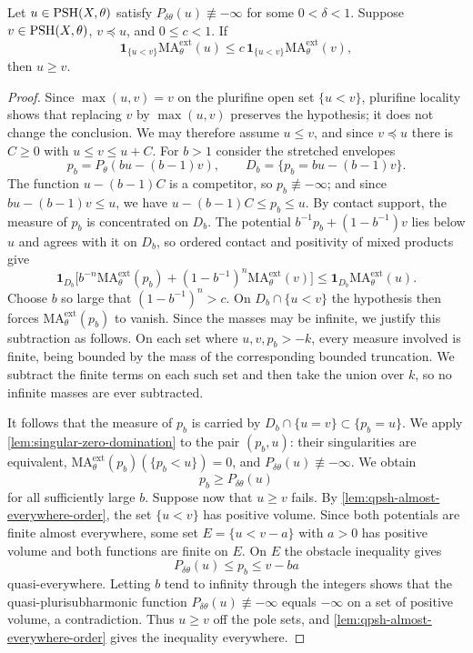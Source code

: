 \begin{theorem}\label{thm:singular-strict-domination}
Let $u\in\mathrm{PSH}(X,\theta)$ satisfy $P_{\delta\theta}(u)\not\equiv-\infty$ for some $0<\delta<1$. Suppose $v\in\mathrm{PSH}(X,\theta)$, $v\preceq u$, and $0\leq c<1$. If
\[
 \mathbf1_{\{u<v\}}\mathrm{MA}^{\mathrm{ext}}_\theta(u)
 \leq c\,\mathbf1_{\{u<v\}}\mathrm{MA}^{\mathrm{ext}}_\theta(v),
\]
then $u\geq v$.
\end{theorem}
\begin{proof}
Since $\max(u,v)=v$ on the plurifine open set $\{u<v\}$, plurifine locality shows that replacing $v$ by $\max(u,v)$ preserves the hypothesis; it does not change the conclusion. We may therefore assume $u\leq v$, and since $v\preceq u$ there is $C\geq0$ with
$u\leq v\leq u+C$. For $b>1$ consider the stretched envelopes
\[
 p_b=P_\theta(bu-(b-1)v),\qquad
 D_b=\{p_b=bu-(b-1)v\}.
\]
The function $u-(b-1)C$ is a competitor, so $p_b\not\equiv-\infty$; and since $bu-(b-1)v\leq u$, we have
$u-(b-1)C\leq p_b\leq u$. By contact support, the measure of $p_b$ is concentrated on $D_b$. The potential
$b^{-1}p_b+(1-b^{-1})v$ lies below $u$ and agrees with it on $D_b$, so ordered contact and positivity of mixed products give
\[
 \mathbf1_{D_b}\bigl[b^{-n}\mathrm{MA}^{\mathrm{ext}}_\theta(p_b)
 +(1-b^{-1})^n\mathrm{MA}^{\mathrm{ext}}_\theta(v)\bigr]
 \leq\mathbf1_{D_b}\mathrm{MA}^{\mathrm{ext}}_\theta(u).
\]
Choose $b$ so large that $(1-b^{-1})^n>c$. On $D_b\cap\{u<v\}$ the hypothesis then forces $\mathrm{MA}^{\mathrm{ext}}_\theta(p_b)$ to vanish. Since the masses may be infinite, we justify this subtraction as follows. On each set where $u,v,p_b>-k$, every measure involved is finite, being bounded by the mass of the corresponding bounded truncation. We subtract the finite terms on each such set and then take the union over $k$, so no infinite masses are ever subtracted.

It follows that the measure of $p_b$ is carried by $D_b\cap\{u=v\}\subset\{p_b=u\}$. We apply \cref{lem:singular-zero-domination} to the pair $(p_b,u)$: their singularities are equivalent, $\mathrm{MA}^{\mathrm{ext}}_\theta(p_b)(\{p_b<u\})=0$, and $P_{\delta\theta}(u)\not\equiv-\infty$. We obtain
\[
 p_b\geq P_{\delta\theta}(u)
\]
for all sufficiently large $b$. Suppose now that $u\geq v$ fails. By \cref{lem:qpsh-almost-everywhere-order}, the set $\{u<v\}$ has positive volume. Since both potentials are finite almost everywhere, some set $E=\{u<v-a\}$ with $a>0$ has positive volume and both functions are finite on $E$. On $E$ the obstacle inequality gives
\[
 P_{\delta\theta}(u)\leq p_b\leq v-ba
\]
quasi-everywhere. Letting $b$ tend to infinity through the integers shows that the quasi-plurisubharmonic function $P_{\delta\theta}(u)\not\equiv-\infty$ equals $-\infty$ on a set of positive volume, a contradiction. Thus $u\geq v$ off the pole sets, and \cref{lem:qpsh-almost-everywhere-order} gives the inequality everywhere.
\end{proof}


